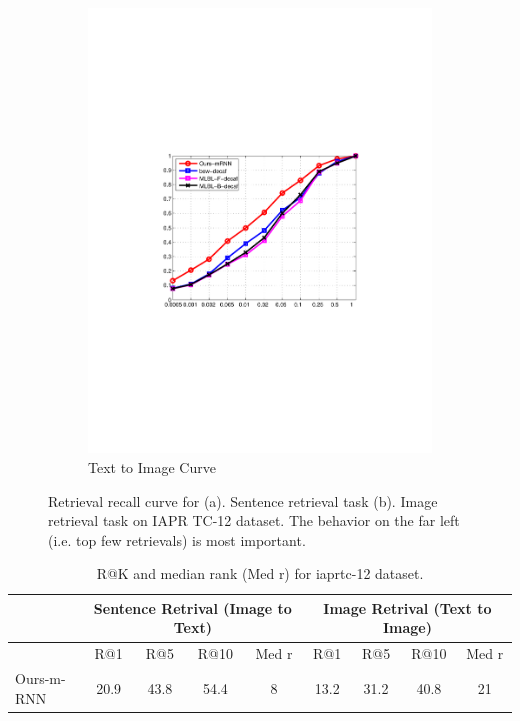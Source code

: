 \begin{figure}[htb]
\begin{subfigure}[b]{0.42\textwidth}
                \includegraphics[width=\textwidth]{PaperFigures/T2I_iaprtc.pdf}
                \caption{Text to Image Curve}
        \end{subfigure}
        \caption{Retrieval recall curve for (a). Sentence retrieval task (b). Image retrieval task on IAPR TC-12 dataset. The behavior on the far left (i.e. top few retrievals) is most important.}
        \label{fig:iaprtc_ret_curve}
\end{figure}

\begin{table}[htb]
	\centering
\begin{tabular}{l|cccc|cccc}
\hline
      & \multicolumn{4}{c|}{Sentence Retrival (Image to Text)} & \multicolumn{4}{c}{Image Retrival (Text to Image)} \\
\hline
      & R@1   & R@5   & R@10  & Med r & R@1   & R@5   & R@10  & Med r \\
\hline
Ours-m-RNN & 20.9  & 43.8  & 54.4  & 8     & 13.2  & 31.2  & 40.8  & 21 \\
\hline
\end{tabular}%
	\caption{R@K and median rank (Med r) for iaprtc-12 dataset.}
	\label{tab:iaprtc_ret}
\end{table}

